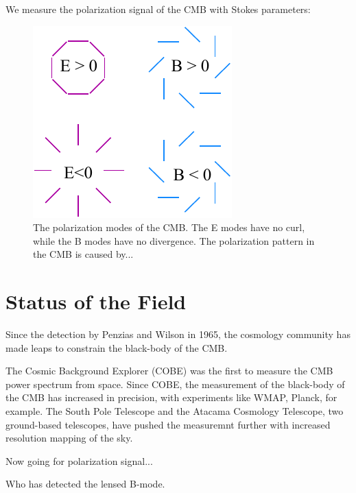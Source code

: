 We measure the polarization signal of the CMB with Stokes parameters:

\begin{figure}
    \centering
    \includegraphics[width = .45\textwidth]{Figures/EB_pol.pdf}
    \caption{The polarization modes of the CMB.  The E modes have no curl, while the B modes have no divergence.  The polarization pattern in the CMB is caused by...}
    \label{fig:e_b_pol}
\end{figure}

\section{Status of the Field}
Since the detection by Penzias and Wilson in 1965, the cosmology community has made leaps to constrain the black-body of the CMB.  

The Cosmic Background Explorer (COBE) was the first to measure the CMB power spectrum from space.  Since COBE, the measurement of the black-body of the CMB has increased in precision, with experiments like WMAP, Planck, for example.  The South Pole Telescope and the Atacama Cosmology Telescope, two ground-based telescopes, have pushed the measuremnt further with increased resolution mapping of the sky.

Now going for polarization signal...

Who has detected the lensed B-mode. 




